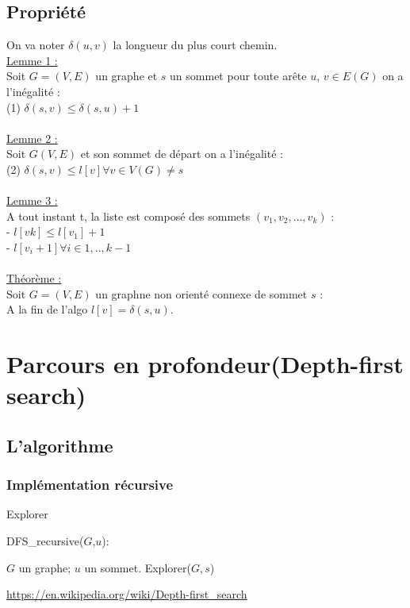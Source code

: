 \documentclass{article}
\begin{document}
\subsection{Propriété}
On va noter $\delta(u,v)$ la longueur du plus court chemin.
\\
\underline{Lemme 1 :} \\
Soit $G=(V,E)$ un graphe et $s$ un sommet pour toute arête $u$, $v \in E(G)$ on a l’inégalité : \\
(1) $\delta(s,v) \leq \delta(s,u)+1$ \\
\\
\underline{Lemme 2 :} \\
Soit $G(V,E)$ et son sommet de départ on a l’inégalité : \\
 (2) $\delta(s,v) \leq l[v] \forall v \in V(G) \neq s$ \\
 \\ 
\underline{Lemme 3 :} \\
A tout instant t, la liste est composé des sommets $(v_1,v_2,… ,v_k)$ : \\
- $l[vk] \leq l[v_1]+1$ \\
- $l[v_i+1] \forall i \in {1,..,k-1}$ \\
\\
\underline{Théorème : } \\
Soit $G=(V,E)$ un graphne non orienté connexe de sommet $s$ : \\
A la fin de l’algo $l[v]=\delta(s,u)$. \\
\section{Parcours en profondeur(Depth-first search)}
\subsection{L'algorithme}
\subsubsection{Implémentation récursive}
\begin{algorithm}
\caption{Explorer}
\begin{algorithmic}
\REQUIRE $G$ un graphe; $u$ un sommet.
\STATE Marquer($s$)
\PRINT $s$
\STATE{Explorer($G,t$)
\ENDIF
\ENDFOR
\end{algorithmic}
\end{algorithm}   
\begin{algorithm}
\caption{DFS\_recursive($G$,$u$):}
\begin{algorithmic}
\REQUIRE $G$ un graphe; $u$ un sommet. 
\STATE Explorer($G,s$)
\ENDIF
\ENDFOR
\end{algorithmic}
\end{algorithm}
\url{https://en.wikipedia.org/wiki/Depth-first_search}
\newpage
\end{document}
